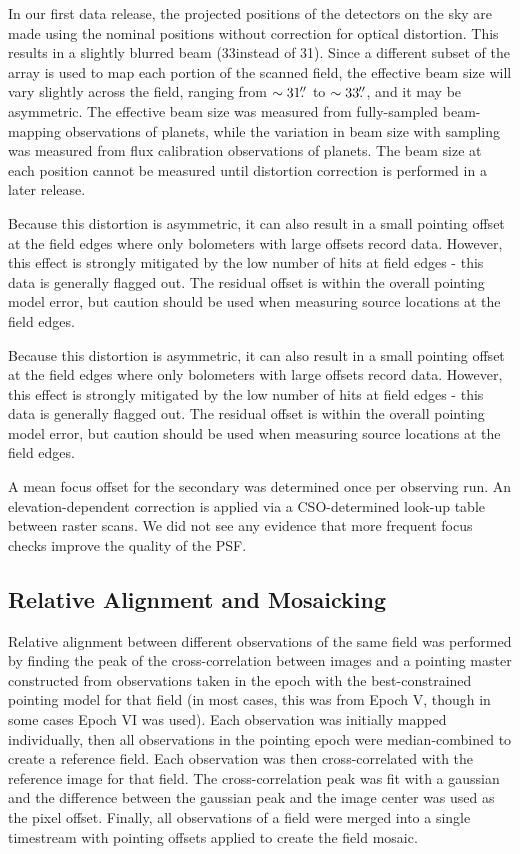 \documentclass{emulateapj}
\newcommand{\bcamfwhm}{33\arcsec}
\begin{document}
In our first data release, the projected positions of the detectors on
the sky are made using the nominal positions without correction for
optical distortion.  This results in a slightly blurred beam
(\bcamfwhm instead of 31).  Since a different subset of the
array is used to map each portion of the scanned field, the effective
beam size will vary slightly across the field, ranging from
$\sim31\mbox{$.\!\!^{\prime\prime}$}$ to $\sim33\mbox{$.\!\!^{\prime\prime}$}$, and it may be asymmetric.  The
effective beam size was measured from fully-sampled beam-mapping
observations of planets, while the variation in beam size with
sampling was measured from flux calibration observations of planets.
The beam size at each position cannot be measured until distortion
correction is performed in a later release.

Because this distortion is asymmetric, it can also result in a small
pointing offset at the field edges where only bolometers with large
offsets record data.  However, this effect is strongly mitigated by
the low number of hits at field edges - this data is generally flagged
out.  The residual offset is within the overall pointing model error,
but caution should be used when measuring source locations at the
field edges.

Because this distortion is asymmetric, it can also result in a small pointing
offset at the field edges where only bolometers with large offsets record data.
However, this effect is strongly mitigated by the low number of hits at field
edges - this data is generally flagged out.  The residual offset is within the
overall pointing model error, but caution should be used when measuring
source locations at the field edges. 

A mean focus offset for the secondary was determined once per
observing run.  An elevation-dependent correction is applied via a
CSO-determined look-up table between raster scans.  We did not see any
evidence that more frequent focus checks improve the quality of the
PSF.

\subsection{Relative Alignment and Mosaicking}

Relative alignment between different observations of the same field
was performed by finding the peak of the cross-correlation between
images and a pointing master constructed from observations taken in
the epoch with the best-constrained pointing model for that field (in
most cases, this was from Epoch V, though in some cases Epoch VI was
used).  Each observation was initially mapped individually, then all
observations in the pointing epoch were median-combined to create a
reference field.  Each observation was then cross-correlated with the
reference image for that field. The cross-correlation peak was fit
with a gaussian and the difference between the gaussian peak and the
image center was used as the pixel offset.  Finally, all observations
of a field were merged into a single timestream with pointing offsets
applied to create the field mosaic.
\end{document}
